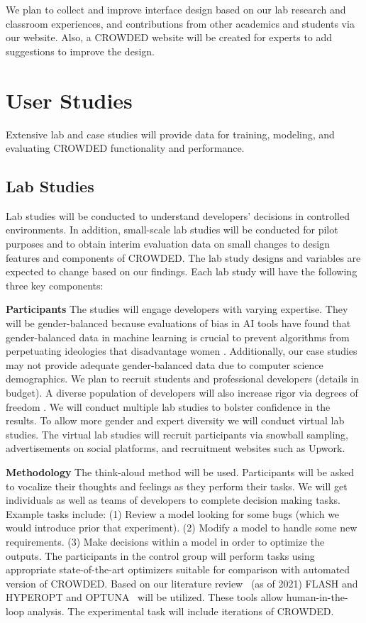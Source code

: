 We plan to collect and improve interface design based on our lab research and classroom experiences, and contributions from other academics and students via our website.  Also, a CROWDED website will be created for experts to add suggestions to improve the design.

\section{User Studies}\label{rqs}
Extensive lab and case studies will provide data for training, modeling, and evaluating CROWDED functionality and performance.

\subsection{Lab Studies}\label{LabStudy}
Lab studies will be conducted to understand developers' decisions in controlled environments. In addition, small-scale lab studies will be conducted for pilot purposes and to obtain interim evaluation data on small changes to design features and components of CROWDED. The lab study designs and variables are expected to change based on our findings. Each lab study will have the following three key components:

\textbf{Participants} The studies will engage developers with varying expertise. They will be gender-balanced because evaluations of bias in AI tools have found that gender-balanced data in machine learning is crucial to prevent algorithms from perpetuating ideologies that disadvantage women \cite{Leavy2018}. Additionally, our case studies may not provide adequate gender-balanced data due to computer science demographics. We plan to recruit students and professional developers (details in budget). A diverse population of developers will also increase rigor via degrees of freedom \cite{Sjazberg2003}. We will conduct multiple lab studies to bolster confidence in the results. To allow more gender and expert diversity we will conduct virtual lab studies. The virtual lab studies will recruit participants via snowball sampling, advertisements on social platforms, and recruitment websites such as Upwork.

\textbf{Methodology} The think-aloud method \cite{lewisusing, Seaman1999} will be used. Participants will be asked to vocalize their thoughts and feelings as they perform their tasks. We will get individuals as well as teams of developers to complete decision making tasks. Example tasks include: (1) Review a model looking for some bugs (which we would introduce prior that experiment). (2) Modify a model to handle some new requirements. (3) Make decisions within a model in order to optimize the outputs. The participants in the control group will perform tasks using appropriate state-of-the-art optimizers suitable for comparison with automated version of CROWDED. Based on our literature review~\cite{lustosa21} (as of 2021) FLASH and HYPEROPT and OPTUNA~\cite{bergstra2015hyperopt,nair18,akiba2019optuna} will be utilized. These tools allow  human-in-the-loop analysis. The experimental task will include iterations of CROWDED.

